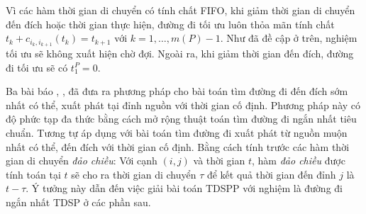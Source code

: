 \documentclass[../main.tex]{subfiles}
\begin{document}
Vì các hàm thời gian di chuyển có tính chất FIFO, khi giảm thời gian di
chuyển đến đích hoặc thời gian thực hiện, đường đi tối ưu luôn thỏa mãn
tính chất \(t_k + c_{i_k, i_{k+1}}(t_k) = t_{k+1}\) với
\(k = 1, \dots, m(P)-1\). Như đã đề cập ở trên, nghiệm tối ưu sẽ không
xuất hiện chờ đợi. Ngoài ra, khi giảm thời gian đến đích, đường đi tối
ưu sẽ có \(t_1^P = 0\).

Ba bài báo \cite{cooke1966shortest}, \cite{orda1990shortest}, \cite{dean2004shortest} đã đưa ra phương pháp
cho bài toán tìm đường đi đến đích sớm nhất có thể,  xuất phát tại đỉnh nguồn với thời gian cố định. 
Phương pháp này có độ phức tạp đa thức bằng cách mở rộng thuật toán tìm đường đi ngắn nhất
tiêu chuẩn. Tương tự áp dụng với bài toán tìm đường đi 
xuất phát từ nguồn muộn nhất có thể, đến đích với thời gian cố định.
Bằng cách tính trước các hàm thời gian di chuyển \emph{đảo chiều}: Với
cạnh \((i, j)\) và thời gian \(t\), hàm \emph{đảo chiều} được tính toán
tại \(t\) sẽ cho ra thời gian di chuyển \(\tau\) để kết quả thời gian
đến đỉnh \(j\) là \(t-\tau\). Ý tưởng này dẫn đến việc giải bài toán
TDSPP với nghiệm là đường đi ngắn nhất TDSP ở các phần sau.
\backmatter
\end{document}
